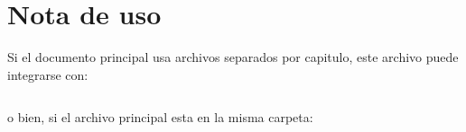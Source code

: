 \section{Nota de uso}

Si el documento principal usa archivos separados por capitulo, este archivo puede integrarse con:
\begin{verbatim}

\end{verbatim}

o bien, si el archivo principal esta en la misma carpeta:
\begin{verbatim}

\end{verbatim}
